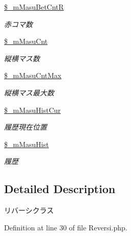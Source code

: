 \begin{DoxyCompactItemize}
\mbox{\label{class_reversi_a2fa15ed849e65338bbd900a09080c70b}} 
\hyperlink{class_reversi_a2fa15ed849e65338bbd900a09080c70b}{\$\+\_\+m\+Masu\+Bet\+CntR}
\begin{DoxyCompactList}\small\item\em 赤コマ数 \end{DoxyCompactList}\item 
\mbox{\label{class_reversi_a8ac63bcef31cc4d29b244456c62677bc}} 
\hyperlink{class_reversi_a8ac63bcef31cc4d29b244456c62677bc}{\$\+\_\+m\+Masu\+Cnt}
\begin{DoxyCompactList}\small\item\em 縦横マス数 \end{DoxyCompactList}\item 
\mbox{\label{class_reversi_ae40f5163a8835d2ee564386a09ce196a}} 
\hyperlink{class_reversi_ae40f5163a8835d2ee564386a09ce196a}{\$\+\_\+m\+Masu\+Cnt\+Max}
\begin{DoxyCompactList}\small\item\em 縦横マス最大数 \end{DoxyCompactList}\item 
\mbox{\label{class_reversi_af77c253cf42f9796e0bdc729e6d0c087}} 
\hyperlink{class_reversi_af77c253cf42f9796e0bdc729e6d0c087}{\$\+\_\+m\+Masu\+Hist\+Cur}
\begin{DoxyCompactList}\small\item\em 履歴現在位置 \end{DoxyCompactList}\item 
\mbox{\label{class_reversi_ad5e2d002bf79a6295aea9513cb11f2e3}} 
\hyperlink{class_reversi_ad5e2d002bf79a6295aea9513cb11f2e3}{\$\+\_\+m\+Masu\+Hist}
\begin{DoxyCompactList}\small\item\em 履歴 \end{DoxyCompactList}\end{DoxyCompactItemize}


\subsection{Detailed Description}
リバーシクラス 

Definition at line 30 of file Reversi.\+php.



